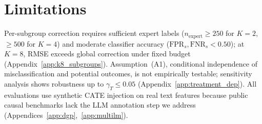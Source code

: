 \section*{Limitations}
\label{sec:limitations}

Per-subgroup correction requires sufficient expert labels ($n_{\text{expert}} \geq 250$ for $K{=}2$, $\geq 500$ for $K{=}4$) and moderate classifier accuracy ($\mathrm{FPR}_s, \mathrm{FNR}_s < 0.50$); at $K{=}8$, RMSE exceeds global correction under fixed budget (Appendix~\ref{app:k8_subgroups}).
Assumption~(A1), conditional independence of misclassification and potential outcomes, is not empirically testable; sensitivity analysis shows robustness up to $\gamma_T \leq 0.05$ (Appendix~\ref{app:treatment_dep}).
All evaluations use synthetic CATE injection on real text features because public causal benchmarks lack the LLM annotation step we address (Appendices~\ref{app:dgp},~\ref{app:multilm}).
